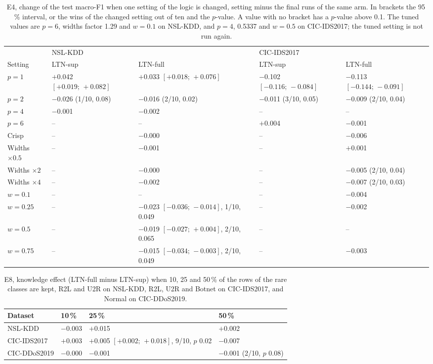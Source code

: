 \begin{table}[htbp]
\centering
\footnotesize
\caption{E4, change of the test macro-F1 when one setting of the logic is changed, setting minus the final runs of
the same arm. In brackets the 95\,\% interval, or the wins of the changed setting out of ten and the $p$-value. A value
with no bracket has a $p$-value above 0.1. The tuned values are $p=6$, widths factor 1.29 and $w=0.1$ on NSL-KDD, and
$p=4$, 0.5337 and $w=0.5$ on CIC-IDS2017; the tuned setting is not run again.}
\label{tab:app-e4}
\scriptsize
\setlength{\tabcolsep}{2pt}
\begin{tabular}{@{}p{1.6cm}p{2.9cm}p{2.9cm}p{2.5cm}p{2.5cm}@{}}
\toprule
 & \multicolumn{2}{l}{NSL-KDD} & \multicolumn{2}{l}{CIC-IDS2017} \\
Setting & LTN-sup & LTN-full & LTN-sup & LTN-full \\
\midrule
$p=1$ & $+$0.042 $[+0.019;\,+0.082]$ & $+$0.033 $[+0.018;\,+0.076]$ & $-$0.102 $[-0.116;\,-0.084]$ & $-$0.113 $[-0.144;\,-0.091]$ \\
$p=2$ & $-$0.026 (1/10, 0.08) & $-$0.016 (2/10, 0.02) & $-$0.011 (3/10, 0.05) & $-$0.009 (2/10, 0.04) \\
$p=4$ & $-$0.001 & $-$0.002 & -- & -- \\
$p=6$ & -- & -- & $+$0.004 & $-$0.001 \\
Crisp & -- & $-$0.000 & -- & $-$0.006 \\
Widths $\times 0.5$ & -- & $-$0.001 & -- & $+$0.001 \\
Widths $\times 2$ & -- & $-$0.000 & -- & $-$0.005 (2/10, 0.04) \\
Widths $\times 4$ & -- & $-$0.002 & -- & $-$0.007 (2/10, 0.03) \\
$w=0.1$ & -- & -- & -- & $-$0.004 \\
$w=0.25$ & -- & $-$0.023 $[-0.036;\,-0.014]$, 1/10, 0.049 & -- & $-$0.002 \\
$w=0.5$ & -- & $-$0.019 $[-0.027;\,+0.004]$, 2/10, 0.065 & -- & -- \\
$w=0.75$ & -- & $-$0.015 $[-0.034;\,-0.003]$, 2/10, 0.049 & -- & $-$0.003 \\
\bottomrule
\end{tabular}
\end{table}

\begin{table}[htbp]
\centering
\footnotesize
\caption{E8, knowledge effect (LTN-full minus LTN-sup) when 10, 25 and 50\,\% of the rows of the rare classes are kept,
R2L and U2R on NSL-KDD, R2L, U2R and Botnet on CIC-IDS2017, and Normal on CIC-DDoS2019.}
\label{tab:app-e8}
\setlength{\tabcolsep}{4pt}
\begin{tabular}{@{}llll@{}}
\toprule
Dataset & 10\,\% & 25\,\% & 50\,\% \\
\midrule
NSL-KDD      & $-$0.003 & $+$0.015 & $+$0.002 \\
CIC-IDS2017  & $+$0.003 & $+$0.005 $[+0.002;\,+0.018]$, 9/10, $p$ 0.02 & $-$0.007 \\
CIC-DDoS2019 & $-$0.000 & $-$0.001 & $-$0.001 (2/10, $p$ 0.08) \\
\bottomrule
\end{tabular}
\end{table}

